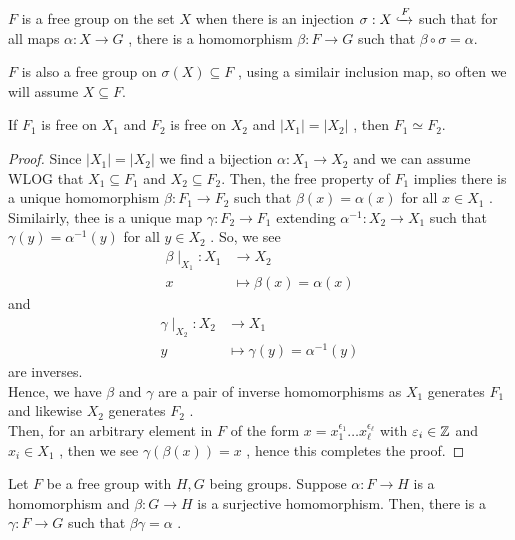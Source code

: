 \begin{recall}
	\(F\)  is a free group on the set \(X\)  when there is an injection \(\sigma: X \xhookrightarrow F\)  such that for all maps \(\alpha: X \to G\) , there is a homomorphism \(\beta: F \to G\)  such that \(\beta \circ\sigma = \alpha\).
\end{recall}
\begin{remark}
	\(F\)  is also a free group on \(\sigma\left( X \right) \subseteq F\) , using a similair inclusion map, so often we will assume \(X \subseteq F\).
\end{remark}
\begin{theorem}
	If \(F_1\)  is free on \(X_1\)  and \(F_2\)  is free on \(X_2\)  and \(\left| X_1 \right|  = \left| X_2 \right| \) , then \(F_1 \simeq F_2\).
\end{theorem}
\begin{proof}
	Since \(\left| X_1 \right|  = \left| X_2 \right| \)  we find a bijection \(\alpha : X_1 \to X_2\)  and we can assume WLOG that \(X_1 \subseteq F_1\)  and \(X_2 \subseteq F_2\). Then, the free property of \(F_1\)  implies there is a unique homomorphism \(\beta: F_1 \to F_2\)  such that \(\beta\left( x \right)  = \alpha\left( x \right) \) for all \(x \in X_1\) . Similairly, thee is a unique map \(\gamma : F_2 \to F_1\)  extending \(\alpha^{-1} : X_2 \to X_1\)  such that \(\gamma \left( y \right)  = \alpha^{-1}\left( y \right) \)  for all \(y \in X_2\) . So, we see \begin{align*}
		\beta \mid_{X_1}:X_1	  &\longrightarrow  X_2 \\
		x&\longmapsto \beta(x) = \alpha\left( x \right)
	\end{align*}
and \begin{align*}
	\gamma \mid_{X_2}: X_2  &\longrightarrow  X_1 \\
	y&\longmapsto \gamma(y) = \alpha^{-1}\left( y \right)
\end{align*}
are inverses.\\
Hence, we have \(\beta\) and \(\gamma\) are a pair of inverse homomorphisms as \(X_1\)  generates \(F_1\)  and likewise \(X_2\)  generates \(F_2\) .\\
Then, for an arbitrary element in \(F\)  of the form \(x = x_1^{\epsilon_1}\ldots x_{\ell}^{\epsilon_{\ell}}\)  with \(\varepsilon_{i} \in \mathbb{Z}\)  and \(x_{i} \in X_1\) , then we see \(\gamma(\beta\left(  x \right)) =   x\) , hence this completes the proof.
\end{proof}
\begin{theorem}
	Let \(F\)  be a free group with \(H, G\)  being groups. Suppose \(\alpha: F \to H\)  is a homomorphism and \(\beta: G \to H\)  is a surjective homomorphism. Then, there is a \(\gamma : F \to G\)  such that \(\beta \gamma = \alpha\) .
\end{theorem}
